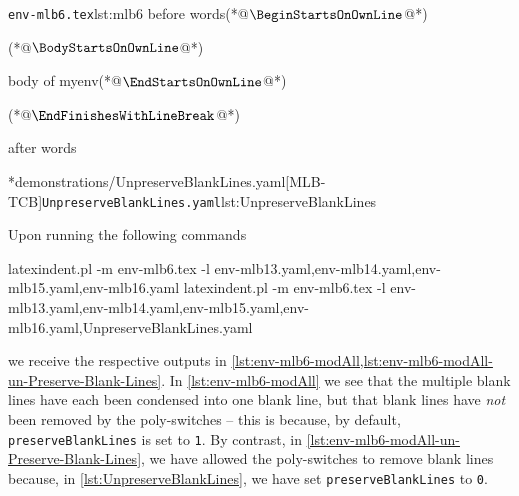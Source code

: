 	\begin{minipage}{.45\linewidth}
		\begin{cmhlistings}[style=tcblatex,escapeinside={(*@}{@*)}]{\texttt{env-mlb6.tex}}{lst:mlb6}
before words(*@$\BeginStartsOnOwnLine$@*)


\begin{myenv}(*@$\BodyStartsOnOwnLine$@*)


body of myenv(*@$\EndStartsOnOwnLine$@*)


\end{myenv}(*@$\EndFinishesWithLineBreak$@*)

after words
\end{cmhlistings}
	\end{minipage}%
	\hfill
	\begin{minipage}{.45\linewidth}
		\cmhlistingsfromfile[style=yaml-LST]*{demonstrations/UnpreserveBlankLines.yaml}[MLB-TCB]{\texttt{UnpreserveBlankLines.yaml}}{lst:UnpreserveBlankLines}
	\end{minipage}

	Upon running the following commands \begin{widepage} \begin{commandshell}
latexindent.pl -m env-mlb6.tex -l env-mlb13.yaml,env-mlb14.yaml,env-mlb15.yaml,env-mlb16.yaml
latexindent.pl -m env-mlb6.tex -l env-mlb13.yaml,env-mlb14.yaml,env-mlb15.yaml,env-mlb16.yaml,UnpreserveBlankLines.yaml
\end{commandshell} \end{widepage} we receive the respective outputs in \cref{lst:env-mlb6-modAll,lst:env-mlb6-modAll-un-Preserve-Blank-Lines}.
	In \cref{lst:env-mlb6-modAll} we see that the multiple blank lines have each been condensed into one blank line, but that blank lines have \emph{not} been removed by the poly-switches -- this is because, by default, \texttt{preserveBlankLines} is set to \texttt{1}.
	By contrast, in \cref{lst:env-mlb6-modAll-un-Preserve-Blank-Lines}, we have allowed the poly-switches to remove blank lines because, in \cref{lst:UnpreserveBlankLines}, we have set \texttt{preserveBlankLines} to \texttt{0}.

	\begin{widepage}
		\begin{minipage}{.30\linewidth}
		\end{minipage}
		\hfill
		\begin{minipage}{.65\linewidth}
		\end{minipage}
	\end{widepage}

